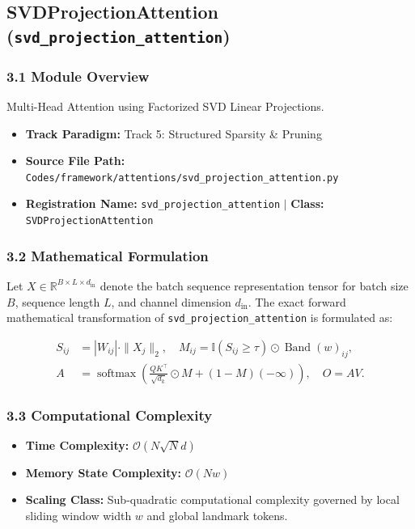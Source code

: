 \subsection{SVDProjectionAttention (\texttt{svd\_projection\_attention})}
\label{sec:app_module_svd_projection_attention}

\subsubsection*{3.1 Module Overview}
Multi-Head Attention using Factorized SVD Linear Projections.
\begin{itemize}
    \item \textbf{Track Paradigm:} Track 5: Structured Sparsity \& Pruning
    \item \textbf{Source File Path:} \texttt{Codes/framework/attentions/svd\_projection\_attention.py}
    \item \textbf{Registration Name:} \texttt{svd\_projection\_attention} $\mid$ \textbf{Class:} \texttt{SVDProjectionAttention}
\end{itemize}

\subsubsection*{3.2 Mathematical Formulation}
Let $X \in \mathbb{R}^{B \times L \times d_{\text{in}}}$ denote the batch sequence representation tensor for batch size $B$, sequence length $L$, and channel dimension $d_{\text{in}}$. The exact forward mathematical transformation of \texttt{svd\_projection\_attention} is formulated as:

\begin{align}
S_{ij} &= |W_{ij}| \cdot \|X_j\|_2, \quad M_{ij} = \mathbb{I}(S_{ij} \ge \tau) \odot \operatorname{Band}(w)_{ij}, \\
A &= \operatorname{softmax}\left(\frac{Q K^\top}{\sqrt{d_k}} \odot M + (1 - M)(-\infty)\right), \quad O = A V.
\end{align}


\subsubsection*{3.3 Computational Complexity}
\begin{itemize}
    \item \textbf{Time Complexity:} $\mathcal{O}(N \sqrt{N} d)$
    \item \textbf{Memory State Complexity:} $\mathcal{O}(N w)$
    \item \textbf{Scaling Class:} Sub-quadratic computational complexity governed by local sliding window width $w$ and global landmark tokens.
\end{itemize}

